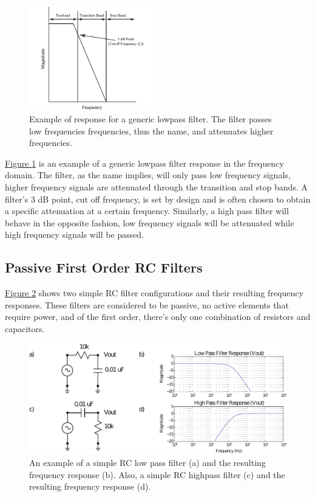 \begin{figure}
	\centering
		\includegraphics[width=0.5\textwidth]{Lab7FilterResponse.pdf}
	\caption{Example of response for a generic lowpass filter. The filter passes low frequencies frequencies, thus the name, and attenuates higher frequencies. } \label{fig:filterResponse}
\end{figure}

\hyperref[fig:filterResponse]{Figure \ref*{fig:filterResponse}} is an example of a generic lowpass filter response in the frequency domain. The filter, as the name implies, will only pass low frequency signals, higher frequency signals are attenuated through the transition and stop bands. A filter's 3 dB point, cut off frequency, is set by design and is often chosen to obtain a specific attenuation at a certain frequency. Similarly, a high pass filter will behave in the opposite fashion, low frequency signals will be attenuated while high frequency signals will be passed. 

\subsection{Passive First Order RC Filters}

\hyperref[fig:simpleRC]{Figure \ref*{fig:simpleRC}} shows two simple RC filter configurations and their resulting frequency responses. These filters are considered to be passive, no active elements that require power, and of the first order, there's only one combination of resistors and capacitors. 

\begin{figure}[h]
	\centering
		\includegraphics[width=1\textwidth]{Lab9RCFilters.pdf}
	\caption{An example of a simple RC low pass filter (a) and the resulting frequency response (b). Also, a simple RC highpass filter (c) and the resulting frequency response (d).} \label{fig:simpleRC}
\end{figure}

